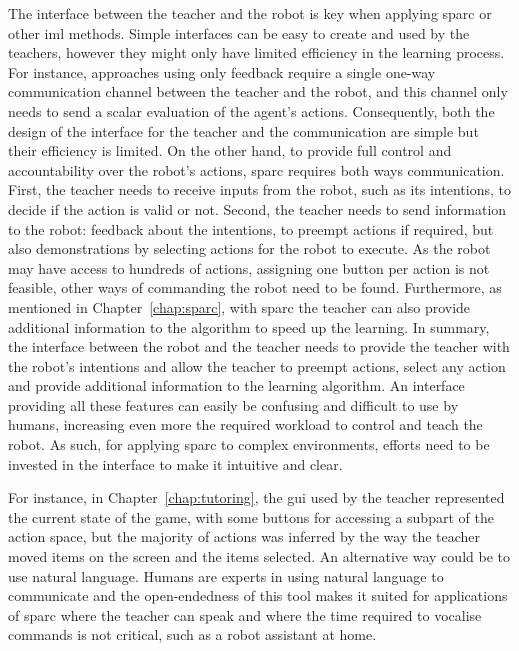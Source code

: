 The interface between the teacher and the robot is key when applying \gls{sparc} or other \gls{iml} methods. Simple interfaces can be easy to create and used by the teachers, however they might only have limited efficiency in the learning process. For instance, approaches using only feedback require a single one-way communication channel between the teacher and the robot, and this channel only needs to send a scalar evaluation of the agent's actions. Consequently, both the design of the interface for the teacher and the communication are simple but their efficiency is limited. On the other hand, to provide full control and accountability over the robot's actions, \gls{sparc} requires both ways communication. First, the teacher needs to receive inputs from the robot, such as its intentions, to decide if the action is valid or not. Second, the teacher needs to send information to the robot: feedback about the intentions, to preempt actions if required, but also demonstrations by selecting actions for the robot to execute. As the robot may have access to hundreds of actions, assigning one button per action is not feasible, other ways of commanding the robot need to be found. Furthermore, as mentioned in Chapter~\ref{chap:sparc}, with \gls{sparc} the teacher can also provide additional information to the algorithm to speed up the learning. In summary, the interface between the robot and the teacher needs to provide the teacher with the robot's intentions and allow the teacher to preempt actions, select any action and provide additional information to the learning algorithm. An interface providing all these features can easily be confusing and difficult to use by humans, increasing even more the required workload to control and teach the robot. As such, for applying \gls{sparc} to complex environments, efforts need to be invested in the interface to make it intuitive and clear. 

For instance, in Chapter~\ref{chap:tutoring}, the \gls{gui} used by the teacher represented the current state of the game, with some buttons for accessing a subpart of the action space, but the majority of actions was inferred by the way the teacher moved items on the screen and the items selected. An alternative way could be to use natural language. Humans are experts in using natural language to communicate and the open-endedness of this tool makes it suited for applications of \gls{sparc} where the teacher can speak and where the time required to vocalise commands is not critical, such as a robot assistant at home.


